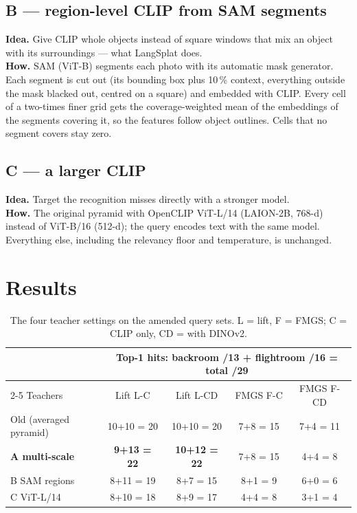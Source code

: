 \documentclass[11pt,a4paper]{article}
\begin{document}
\subsection{B --- region-level CLIP from SAM segments}
\textbf{Idea.} Give CLIP whole objects instead of square windows that mix an object with its surroundings
--- what LangSplat does.\\
\textbf{How.} SAM (ViT-B) segments each photo with its automatic mask generator. Each segment is cut out (its
bounding box plus 10\,\% context, everything outside the mask blacked out, centred on a square) and embedded with
CLIP. Every cell of a two-times finer grid gets the coverage-weighted mean of the embeddings of the segments
covering it, so the features follow object outlines. Cells that no segment covers stay zero.

\subsection{C --- a larger CLIP}
\textbf{Idea.} Target the recognition misses directly with a stronger model.\\
\textbf{How.} The original pyramid with OpenCLIP ViT-L/14 (LAION-2B, 768-d) instead of ViT-B/16 (512-d); the query
encodes text with the same model. Everything else, including the relevancy floor and temperature, is unchanged.

\section{Results}

\begin{table}[ht]
\centering\small
\begin{tabular}{@{}lcccc@{}}
\toprule
 & \multicolumn{4}{c}{Top-1 hits: backroom /13 + flightroom /16 = total /29} \\
\cmidrule(l){2-5}
Teachers & Lift L-C & Lift L-CD & FMGS F-C & FMGS F-CD \\
\midrule
Old (averaged pyramid)  & 10+10 = 20 & 10+10 = 20 & 7+8 = 15 & 7+4 = 11 \\
\textbf{A multi-scale}  & \textbf{9+13 = 22} & \textbf{10+12 = 22} & 7+8 = 15 & 4+4 = 8 \\
B SAM regions           & 8+11 = 19 & 8+7 = 15 & 8+1 = 9 & 6+0 = 6 \\
C ViT-L/14              & 8+10 = 18 & 8+9 = 17 & 4+4 = 8 & 3+1 = 4 \\
\bottomrule
\end{tabular}
\caption{The four teacher settings on the amended query sets. L = lift, F = FMGS; C = CLIP only, CD = with DINOv2.}
\label{tab:main}
\end{table}
\end{document}
